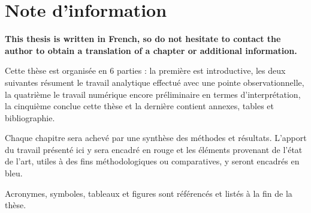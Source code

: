 \chapter{Note d'information} 

\textbf{This thesis is written in French, so do not hesitate to contact the author to obtain a translation of a chapter or additional information.} 

Cette thèse est organisée en $\num{6}$ parties : la première est introductive, les deux suivantes résument le travail analytique effectué avec une pointe observationnelle, la quatrième le travail numérique encore préliminaire en termes d'interprétation, la cinquième conclue cette thèse et la dernière contient annexes, tables et bibliographie.  

Chaque chapitre sera achevé par une synthèse des méthodes et résultats. L'apport du travail présenté ici y sera encadré en rouge et les éléments provenant de l'état de l'art, utiles à des fins méthodologiques ou comparatives, y seront encadrés en bleu.   

Acronymes, symboles, tableaux et figures sont référencés et listés à la fin de la thèse. 
